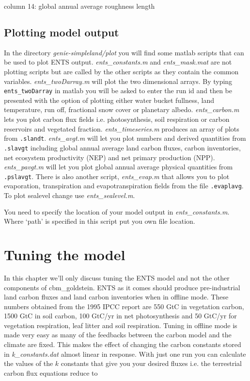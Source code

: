 \documentclass[10pt,a4paper]{report}
\begin{document}
column 14: global annual average roughness length

\section{Plotting model output}

In the directory {\em genie-simpleland/plot} you will find some
matlab scripts that can be used to plot ENTS output. {\em
ents\_constants.m} and {\em ents\_mask.mat} are not plotting scripts
but are called by the other scripts as they contain the common
variables. {\em ents\_twoDarray.m} will plot the two dimensional
arrays. By typing {\tt ents\_twoDarray} in matlab you will be asked
to enter the run id and then be presented with the option of
plotting either water bucket fullness, land temperature, run off,
fractional snow cover or planetary albedo. {\em ents\_carbon.m} lets
you plot carbon flux fields i.e. photosynthesis, soil respiration or
carbon reservoirs and vegetated fraction. {\em ents\_timeseries.m}
produces an array of plots from {\tt .slandt}. {\em ents\_avgt.m}
will let you plot numbers and derived quantities from {\tt .slavgt}
including global annual average land carbon fluxes, carbon
inventories, net ecosystem productivity (NEP) and net primary
production (NPP). {\em ents\_pavgt.m} will let you plot global
annual average physical quantities from {\tt .pslavgt}. There is
also another script, {\em ents\_evap.m} that allows you to plot
evaporation, transpiration and evapotranspiration fields from the
file {\tt .evaplavg}. To plot sealevel change use {\em
ents\_sealevel.m}.

You need to specify the location of your model output in {\em
ents\_constants.m}. Where `path' is specified in this script put you
own file location.

\chapter{Tuning the model}

In this chapter we'll only discuss tuning the ENTS model and not the
other components of cbm\_goldstein. ENTS as it comes should produce
pre-industrial land carbon fluxes and land carbon inventories when
in offline mode. These numbers obtained from the 1995 IPCC report
are 550 GtC in vegetation carbon, 1500 GtC in soil carbon, 100
GtC/yr in net photosynthesis and 50 GtC/yr for vegetation
respiration, leaf litter and soil respiration. Tuning in offline
mode is made very easy as many of the feedbacks between the carbon
model and the climate are fixed. This makes the effect of changing
the carbon constants stored in {\em k\_constants.dat} almost linear
in response. With just one run you can calculate the values of the
$k$ constants that give you your desired fluxes i.e. the terrestrial
carbon flux equations reduce to
\end{document}
